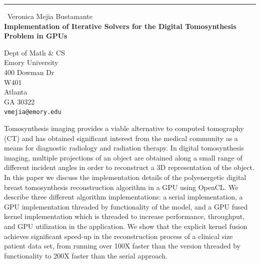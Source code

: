 \documentclass{report}
\begin{document}
\begin{center}
\rule{6in}{1pt} \
{\large Veronica Mejia Bustamante \\
{\bf Implementation of Iterative Solvers for the Digital Tomosynthesis Problem in GPUs}}

Dept of Math & CS \\ Emory University \\ 400 Dowman Dr  \\ W401 \\ Atlanta \\ GA 30322
\\
{\tt vmejia@emory.edu}\end{center}

Tomosynthesis imaging provides a viable alternative to computed
tomography (CT) and has obtained significant interest from the medical
community as a means for diagnostic radiology and radiation therapy. In
digital tomosynthesis imaging, multiple projections of an object are
obtained along a small range of different incident angles in order to
reconstruct a 3D representation of the object. In this paper we discuss
the implementation details of the polyenergetic digital breast
tomosynthesis reconstruction algorithm in a GPU using OpenCL. We describe
three different algorithm implementations: a serial implementation, a GPU
implementation threaded by functionality of the model, and a GPU fused
kernel implementation which is threaded to increase performance,
throughput, and GPU utilization in the application. We show that the
explicit kernel fusion achieves significant speed-up in the
reconstruction process of a clinical size patient data set, from running
over 100X faster than the version threaded by functionality to 200X
faster than the serial approach.
\end{document}
